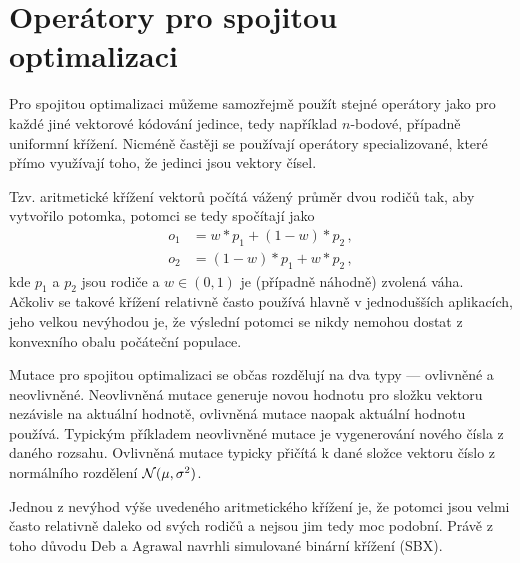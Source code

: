 \section{Operátory pro spojitou optimalizaci}

Pro spojitou optimalizaci můžeme samozřejmě použít stejné operátory jako pro každé jiné vektorové kódování jedince, tedy například $n$-bodové, případně uniformní křížení. Nicméně častěji se používají operátory specializované, které přímo využívají toho, že jedinci jsou vektory čísel.

Tzv. aritmetické křížení vektorů počítá vážený průměr dvou rodičů tak, aby vytvořilo potomka, potomci se tedy spočítají jako
\begin{align*}
o_1 & = w*p_1 + (1-w)* p_2\,, \\
o_2 & = (1-w)*p_1 + w* p_2\,,
\end{align*}
kde $p_1$ a $p_2$ jsou rodiče a $w \in (0,1)$ je (případně náhodně) zvolená váha. Ačkoliv se takové křížení relativně často používá hlavně v jednodušších aplikacích, jeho velkou nevýhodou je, že výslední potomci se nikdy nemohou dostat z konvexního obalu počáteční populace.

Mutace pro spojitou optimalizaci se občas rozdělují na dva typy --- ovlivněné a neovlivněné. Neovlivněná mutace generuje novou hodnotu pro složku vektoru nezávisle na aktuální hodnotě, ovlivněná mutace naopak aktuální hodnotu používá. Typickým příkladem neovlivněné mutace je vygenerování nového čísla z daného rozsahu. Ovlivněná mutace typicky přičítá k dané složce vektoru číslo z normálního rozdělení $\mathcal{N}(\mu, \sigma^2)$.

Jednou z nevýhod výše uvedeného aritmetického křížení je, že potomci jsou velmi často relativně daleko od svých rodičů a nejsou jim tedy moc podobní. Právě z toho důvodu Deb a Agrawal navrhli simulované binární křížení (SBX)\cite{agrawal1995simulated}.